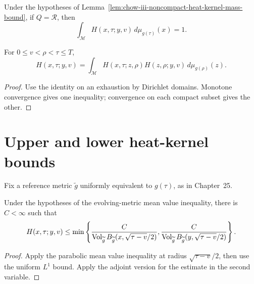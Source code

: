 \begin{corollary}
\label{cor:chow-iii-noncompact-heat-kernel-mass-preservation}


Under the hypotheses of Lemma~\ref{lem:chow-iii-noncompact-heat-kernel-mass-bound},
if \(Q=\mathcal R\), then
\[
 \int_{\mathcal M}H(x,\tau;y,v)\,d\mu_{g(\tau)}(x)=1.
\]
\end{corollary}

\begin{lemma}
\label{lem:chow-iii-noncompact-heat-kernel-semigroup}


For \(0\le v<\rho<\tau\le T\),
\[
 H(x,\tau;y,v)=\int_{\mathcal M}H(x,\tau;z,\rho)
 H(z,\rho;y,v)\,d\mu_{g(\rho)}(z).
\]
\end{lemma}
\begin{proof}
\sketch Use the identity on an exhaustion by Dirichlet domains.  Monotone convergence
gives one inequality; convergence on each compact subset gives the other.
\end{proof}

\section{Upper and lower heat-kernel bounds}

Fix a reference metric \(\widetilde g\) uniformly equivalent to \(g(\tau)\),
as in Chapter~25.

\begin{lemma}
\label{lem:chow-iii-rough-evolving-heat-kernel-upper-bound}


Under the hypotheses of the evolving-metric mean value inequality, there is
\(C<\infty\) such that
\[
 H(x,\tau;y,v)\le\min\left\{
 \frac{C}{\operatorname{Vol}_{\widetilde g}B_{\widetilde g}(x,\sqrt{\tau-v}/2)},
 \frac{C}{\operatorname{Vol}_{\widetilde g}B_{\widetilde g}(y,\sqrt{\tau-v}/2)}
 \right\}.
\]
\end{lemma}
\begin{proof}
\sketch Apply the parabolic mean value inequality at radius \(\sqrt{\tau-v}/2\),
then use the uniform \(L^1\) bound.  Apply the adjoint version for the estimate
in the second variable.
\end{proof}

